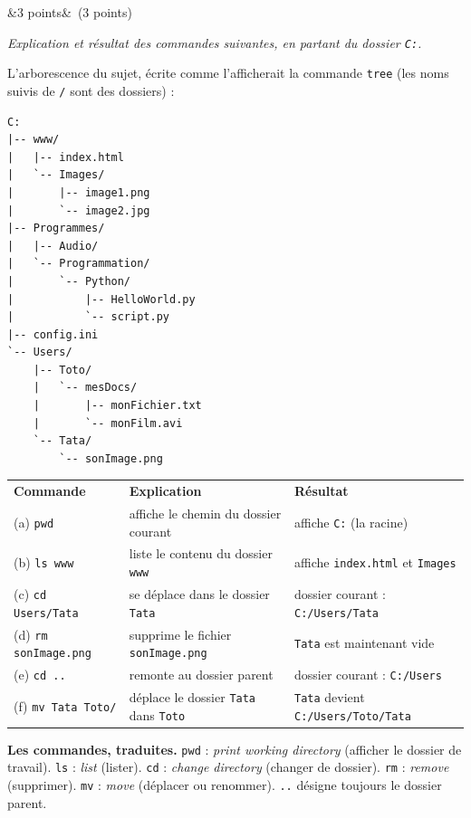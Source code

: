 \documentclass[11pt, a4paper]{exam}
\newcommand{\code}[1]{\texttt{#1}}
\newcommand{\Q}[3]{\par\needspace{5\baselineskip}\bigskip\noindent{\large\bfseries Question #1}\ifx&#2&\else\ \textnormal{(#2)}\fi\par\nopagebreak\smallskip\noindent\textit{#3}\par\nopagebreak\smallskip}
\begin{document}
\Q{7}{3 points}{Explication et résultat des commandes suivantes, en partant du dossier \code{C:}.}
L'arborescence du sujet, écrite comme l'afficherait la commande \code{tree} (les noms suivis de \code{/} sont des dossiers) :
\begin{lstlisting}[numbers=none, language={}, basicstyle=\small\ttfamily]
C:
|-- www/
|   |-- index.html
|   `-- Images/
|       |-- image1.png
|       `-- image2.jpg
|-- Programmes/
|   |-- Audio/
|   `-- Programmation/
|       `-- Python/
|           |-- HelloWorld.py
|           `-- script.py
|-- config.ini
`-- Users/
    |-- Toto/
    |   `-- mesDocs/
    |       |-- monFichier.txt
    |       `-- monFilm.avi
    `-- Tata/
        `-- sonImage.png
\end{lstlisting}
\begin{reponse}
\renewcommand{\arraystretch}{1.2}
\begin{tabular}{@{}>{\raggedright\arraybackslash}p{3.4cm}>{\raggedright\arraybackslash}p{5.9cm}>{\raggedright\arraybackslash}p{5.2cm}@{}}
\textbf{Commande} & \textbf{Explication} & \textbf{Résultat} \\
(a) \code{pwd} & affiche le chemin du dossier courant & affiche \code{C:} (la racine) \\
(b) \code{ls www} & liste le contenu du dossier \code{www} & affiche \code{index.html} et \code{Images} \\
(c) \code{cd Users/Tata} & se déplace dans le dossier \code{Tata} & dossier courant : \code{C:/Users/Tata} \\
(d) \code{rm sonImage.png} & supprime le fichier \code{sonImage.png} & \code{Tata} est maintenant vide \\
(e) \code{cd ..} & remonte au dossier parent & dossier courant : \code{C:/Users} \\
(f) \code{mv Tata Toto/} & déplace le dossier \code{Tata} dans \code{Toto} & \code{Tata} devient \code{C:/Users/Toto/Tata} \\
\end{tabular}
\end{reponse}
\textbf{Les commandes, traduites.} \code{pwd} : \emph{print working directory} (afficher le dossier de travail). \code{ls} : \emph{list} (lister). \code{cd} : \emph{change directory} (changer de dossier). \code{rm} : \emph{remove} (supprimer). \code{mv} : \emph{move} (déplacer ou renommer). \code{..} désigne toujours le dossier parent.
\end{document}
